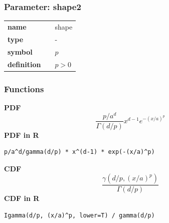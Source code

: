 \subsubsection*{Parameter: shape2}

\noindent\begin{tabular}{p{2cm}cl}
\textbf{name} & & shape \\
\textbf{type} & & - \\
\textbf{symbol} & & $p$  \\
\textbf{definition} & & $p > 0$
\end{tabular}
\subsubsection*{Functions}

\smallskip \noindent \hspace{.2cm} \textbf{PDF} 
\begin{equation*}\frac{p/a^d}{\Gamma(d/p)} x^{d-1}e^{-(x/a)^p}\end{equation*}
\smallskip \noindent \hspace{.2cm} \textbf{PDF in R}  
\begin{verbatim}
p/a^d/gamma(d/p) * x^(d-1) * exp(-(x/a)^p)
\end{verbatim}
\smallskip \noindent \hspace{.2cm} \textbf{CDF} 
\begin{equation*}\frac{\gamma(d/p, (x/a)^p)}{\Gamma(d/p)}\end{equation*}
\smallskip \noindent \hspace{.2cm} \textbf{CDF in R}  
\begin{verbatim}
Igamma(d/p, (x/a)^p, lower=T) / gamma(d/p)
\end{verbatim}

